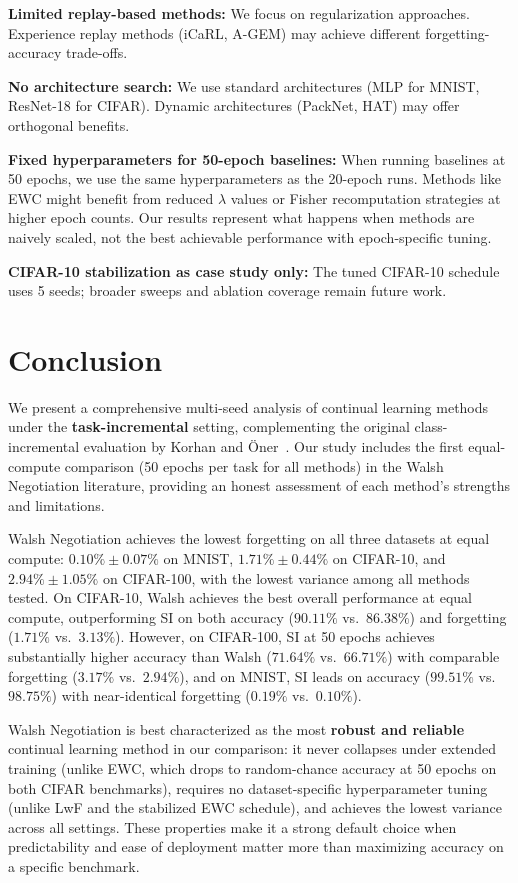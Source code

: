 \documentclass[preprint,review,12pt]{elsarticle}
\begin{document}
\textbf{Limited replay-based methods:} We focus on regularization approaches. Experience replay methods (iCaRL, A-GEM) may achieve different forgetting-accuracy trade-offs.

\textbf{No architecture search:} We use standard architectures (MLP for MNIST, ResNet-18 for CIFAR). Dynamic architectures (PackNet, HAT) may offer orthogonal benefits.

\textbf{Fixed hyperparameters for 50-epoch baselines:} When running baselines at 50 epochs, we use the same hyperparameters as the 20-epoch runs. Methods like EWC might benefit from reduced $\lambda$ values or Fisher recomputation strategies at higher epoch counts. Our results represent what happens when methods are naively scaled, not the best achievable performance with epoch-specific tuning.

\textbf{CIFAR-10 stabilization as case study only:} The tuned CIFAR-10 schedule uses 5 seeds; broader sweeps and ablation coverage remain future work.

\section{Conclusion}

We present a comprehensive multi-seed analysis of continual learning methods under the \textbf{task-incremental} setting, complementing the original class-incremental evaluation by Korhan and {\"O}ner~\cite{korhan2023negotiated}. Our study includes the first equal-compute comparison (50 epochs per task for all methods) in the Walsh Negotiation literature, providing an honest assessment of each method's strengths and limitations.

Walsh Negotiation achieves the lowest forgetting on all three datasets at equal compute: $0.10\% \pm 0.07\%$ on MNIST, $1.71\% \pm 0.44\%$ on CIFAR-10, and $2.94\% \pm 1.05\%$ on CIFAR-100, with the lowest variance among all methods tested. On CIFAR-10, Walsh achieves the best overall performance at equal compute, outperforming SI on both accuracy ($90.11\%$ vs.\ $86.38\%$) and forgetting ($1.71\%$ vs.\ $3.13\%$). However, on CIFAR-100, SI at 50 epochs achieves substantially higher accuracy than Walsh ($71.64\%$ vs.\ $66.71\%$) with comparable forgetting ($3.17\%$ vs.\ $2.94\%$), and on MNIST, SI leads on accuracy ($99.51\%$ vs.\ $98.75\%$) with near-identical forgetting ($0.19\%$ vs.\ $0.10\%$).

Walsh Negotiation is best characterized as the most \textbf{robust and reliable} continual learning method in our comparison: it never collapses under extended training (unlike EWC, which drops to random-chance accuracy at 50 epochs on both CIFAR benchmarks), requires no dataset-specific hyperparameter tuning (unlike LwF and the stabilized EWC schedule), and achieves the lowest variance across all settings. These properties make it a strong default choice when predictability and ease of deployment matter more than maximizing accuracy on a specific benchmark.
\end{document}
